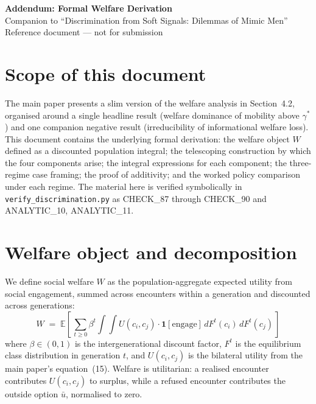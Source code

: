 \documentclass[12pt,a4paper]{article}
\theoremstyle{definition}
\numberwithin{proposition}{section}
\newcommand{\E}{\mathbb{E}}
\begin{document}
\begin{center}
{\Large\bfseries Addendum: Formal Welfare Derivation}\\[0.4em]
{\normalsize Companion to ``Discrimination from Soft Signals:
Dilemmas of Mimic Men''}\\[0.5em]
{\normalsize Reference document --- not for submission}\\[1em]
\end{center}

\section*{Scope of this document}

The main paper presents a slim version of the welfare analysis in
Section~4.2, organised around a single headline result (welfare
dominance of mobility above $\gamma^*$) and one companion negative
result (irreducibility of informational welfare loss). This document
contains the underlying formal derivation: the welfare object $W$
defined as a discounted population integral; the telescoping
construction by which the four components arise; the integral
expressions for each component; the three-regime case framing; the
proof of additivity; and the worked policy comparison under each
regime. The material here is verified symbolically in
\texttt{verify\_discrimination.py} as CHECK\_87 through CHECK\_90
and ANALYTIC\_10, ANALYTIC\_11.

\section{Welfare object and decomposition}
\label{sec:welfare-object}

We define social welfare $W$ as the population-aggregate expected
utility from social engagement, summed across encounters within a
generation and discounted across generations:
\begin{equation}
  W \;=\; \E\!\left[\,
  \sum_{t \geq 0} \beta^t
  \int\!\!\!\int U(c_i, c_j) \cdot \mathbf{1}\!\left[\text{engage}\right]
  \, dF^t(c_i)\, dF^t(c_j)
  \,\right]
  \label{eq:welfare-W}
\end{equation}
where $\beta \in (0,1)$ is the intergenerational discount factor,
$F^t$ is the equilibrium class distribution in generation $t$, and
$U(c_i, c_j)$ is the bilateral utility from the main paper's
equation~(15). Welfare is utilitarian: a realised encounter
contributes $U(c_i, c_j)$ to surplus, while a refused encounter
contributes the outside option $\bar{u}$, normalised to zero.
\end{document}
